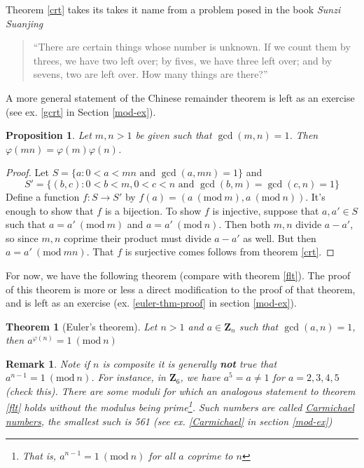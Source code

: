 \documentclass[12pt]{article}
\numberwithin{equation}{subsection}
\newtheorem{thm}[subsection]{Theorem}
\newtheorem{prop}[subsection]{Proposition}
\theoremstyle{note}
\newtheorem{remark}[subsection]{Remark}
\newcommand{\Mod}[1]{\ (\mathrm{mod}\ #1)}
\begin{document}
Theorem \ref{crt} takes its takes it name from a problem posed in the book \textit{Sunzi Suanjing}\begin{quote}``There are certain things whose number is unknown. If we count them by threes, we have two left over; by fives, we have three left over; and by sevens, two are left over. How many things are there?''\end{quote}
A more general statement of the Chinese remainder theorem is left as an exercise (see ex. \ref{gcrt} in Section \ref{mod-ex}).

\begin{prop} \label{mult-varphi}
	Let $m,n>1$ be given such that $\gcd(m,n)=1$. Then $\varphi(mn)=\varphi(m)\varphi(n)$.
\end{prop} 


\begin{proof}Let $S=\{ a : 0 < a < mn \text{ and } \gcd(a,mn)=1\}$ and \[S'=\{(b,c) : 0<b<m, 0<c<n \text{ and } \gcd(b,m)=\gcd(c,n)=1\}\] Define a function $f\colon S\to S'$ by $f(a)=(a\Mod{m},a\Mod{n})$. It's enough to show that $f$ is a bijection. To show $f$ is injective, suppose that $a,a'\in S$ such that $a=a'\Mod{m}$ and $a=a'\Mod{n}$. Then both $m,n$ divide $a-a'$, so since $m,n$ coprime their product must divide $a-a'$ as well. But then $a=a'\Mod{mn}$. That $f$ is surjective comes follows from theorem \ref{crt}.\end{proof}

	
	For now, we have the following theorem (compare with theorem \ref{flt}). The proof of this theorem is more or less a direct modification to the proof of that theorem, and is left as an exercise (ex. \ref{euler-thm-proof} in section \ref{mod-ex}). 


\begin{thm}[Euler's theorem] \label{euler-thm-composite}
	Let $n>1$ and $a\in\mathbf{Z}_n$ such that $\gcd(a,n)=1$, then $a^{\varphi(n)}=1\Mod{n}$
\end{thm}

\begin{remark}
	Note if $n$ is composite it is generally \textbf{not} true that $a^{n-1}=1\Mod{n}$. For instance, in $\mathbf{Z}_6$, we have $a^{5}=a\neq 1$ for $a=2,3,4,5$ (check this). There are \textit{some} moduli for which an analogous statement to theorem \ref{flt} holds without the modulus being prime\footnote{That is, $a^{n-1}=1\Mod{n}$ for all $a$ coprime to $n$}. Such numbers are called \href{https://en.wikipedia.org/wiki/Carmichael_number}{\textit{Carmichael numbers}}, the smallest such is 561 (see ex. \ref{Carmichael} in section \ref{mod-ex})
\end{remark}	
\end{document}
